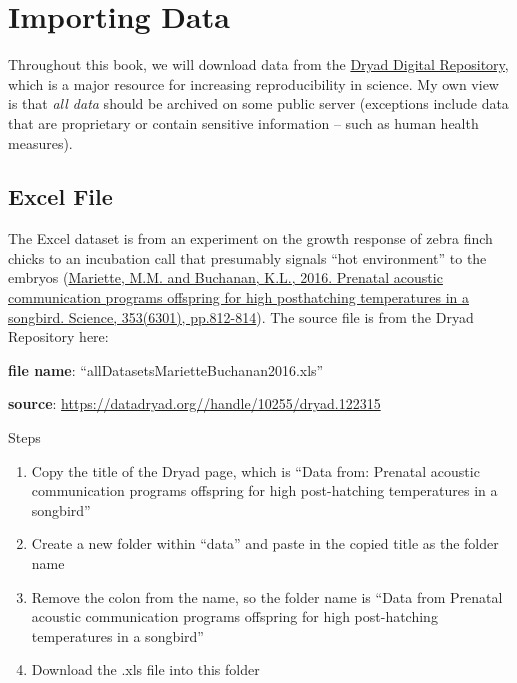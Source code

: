 \documentclass[]{book}
\providecommand{\tightlist}{%
  \setlength{\itemsep}{0pt}\setlength{\parskip}{0pt}}
\begin{document}
\section{Importing Data}\label{importing-data}

Throughout this book, we will download data from the
\href{https://datadryad.org}{Dryad Digital Repository}, which is a major
resource for increasing reproducibility in science. My own view is that
\emph{all data} should be archived on some public server (exceptions
include data that are proprietary or contain sensitive information --
such as human health measures).

\subsection{Excel File}\label{excel-file}

The Excel dataset is from an experiment on the growth response of zebra
finch chicks to an incubation call that presumably signals ``hot
environment'' to the embryos
(\href{http://science.sciencemag.org/content/353/6301/812}{Mariette,
M.M. and Buchanan, K.L., 2016. Prenatal acoustic communication programs
offspring for high posthatching temperatures in a songbird. Science,
353(6301), pp.812-814}). The source file is from the Dryad Repository
here:

\textbf{file name}: ``allDatasetsMarietteBuchanan2016.xls''

\textbf{source}: \url{https://datadryad.org//handle/10255/dryad.122315}

Steps

\begin{enumerate}
\def\labelenumi{\arabic{enumi}.}
\tightlist
\item
  Copy the title of the Dryad page, which is ``Data from: Prenatal
  acoustic communication programs offspring for high post-hatching
  temperatures in a songbird''
\item
  Create a new folder within ``data'' and paste in the copied title as
  the folder name
\item
  Remove the colon from the name, so the folder name is ``Data from
  Prenatal acoustic communication programs offspring for high
  post-hatching temperatures in a songbird''
\item
  Download the .xls file into this folder
\end{enumerate}
\end{document}
